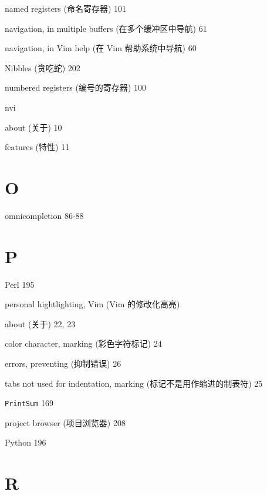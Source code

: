 \begin{multicols}{2}
\hangindent=2pc  named registers (命名寄存器) 101

\hangindent=2pc  navigation, in multiple buffers (在多个缓冲区中导航) 61

\hangindent=2pc  navigation, in Vim help (在 Vim 帮助系统中导航) 60

\hangindent=2pc  Nibbles (贪吃蛇) 202

\hangindent=2pc  numbered registers (编号的寄存器) 100

\hangindent=2pc  nvi \par
\hangindent=2pc \quad about (关于) 10 \par
\hangindent=2pc \quad features (特性) 11 \par

\hangindent=2pc  \section*{O}

\hangindent=2pc  omnicompletion 86-88

\hangindent=2pc  \section*{P}

\hangindent=2pc  Perl 195

\hangindent=2pc  personal hightlighting, Vim (Vim 的修改化高亮) \par
\hangindent=2pc \quad about (关于) 22, 23 \par
\hangindent=2pc \quad color character, marking (彩色字符标记) 24 \par
\hangindent=2pc \quad errors, preventing (抑制错误) 26 \par
\hangindent=2pc \quad tabs not used for indentation, marking (标记不是用作缩进的制表符) 25 \par

\hangindent=2pc  \texttt{PrintSum} 169

\hangindent=2pc  project browser (项目浏览器) 208

\hangindent=2pc  Python 196

\hangindent=2pc  \section*{R}


\end{multicols}
